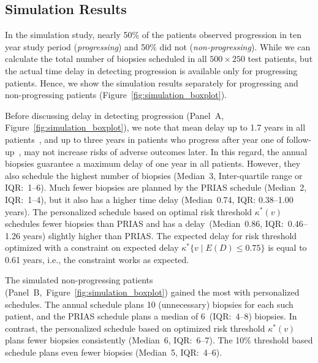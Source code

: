 \documentclass[useAMS, usenatbib, referee]{biom}
\begin{document}
\subsection{Simulation Results}
In the simulation study, nearly 50\% of the patients observed progression in ten year study period (\emph{progressing}) and 50\% did not (\emph{non-progressing}). While we can calculate the total number of biopsies scheduled in all $500 \times 250$ test patients, but the actual time delay in detecting progression is available only for progressing patients. Hence, we show the simulation results separately for progressing and non-progressing patients (Figure~\ref{fig:simulation_boxplot}).

Before discussing delay in detecting progression (Panel~A, Figure~\ref{fig:simulation_boxplot}), we note that mean delay up to 1.7 years in all patients~\citep{inoue2018comparative}, and up to three years in patients who progress after year one of follow-up~\citep{carvalho}, may not increase risks of adverse outcomes later. In this regard, the annual biopsies guarantee a maximum delay of one year in all patients. However, they also schedule the highest number of biopsies (Median~3, Inter-quartile range or IQR:~1--6). Much fewer biopsies are planned by the PRIAS schedule (Median~2, IQR:~1--4), but it also has a higher time delay (Median~0.74, IQR: 0.38--1.00 years). The personalized schedule based on optimal risk threshold $\kappa^*(v)$ schedules fewer biopsies than PRIAS and has a delay~(Median~0.86, IQR:~0.46--1.26 years) slightly higher than PRIAS. The expected delay for risk threshold optimized with a constraint on expected delay $\kappa^*\{v \mid E(D)\leq 0.75\}$ is equal to 0.61 years, i.e., the constraint works as expected.

The simulated non-progressing patients (Panel~B,~Figure~\ref{fig:simulation_boxplot}) gained the most with personalized schedules. The annual schedule plans 10 (unnecessary) biopsies for each such patient, and the PRIAS schedule plans a median of 6~(IQR:~4--8) biopsies. In contrast, the personalized schedule based on optimized risk threshold $\kappa^*(v)$ plans fewer biopsies consistently (Median~6, IQR:~6--7). The 10\% threshold based schedule plans even fewer biopsies (Median~5, IQR:~4--6).
\end{document}
